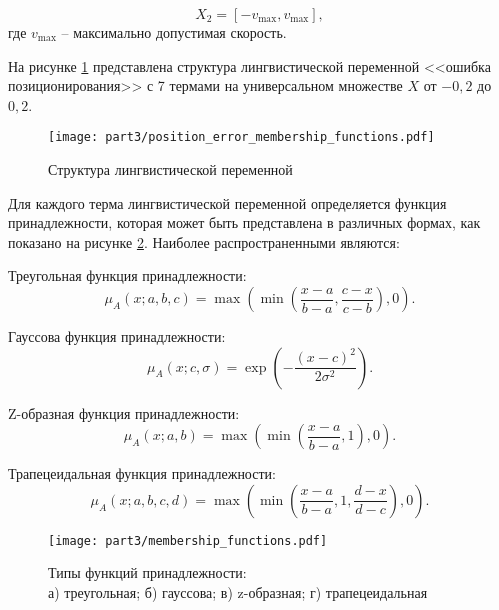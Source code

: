 \begin{equation}
	X_2 = [-v_{\text{max}}, v_{\text{max}}],
\end{equation}
где $v_{\text{max}}$ -- максимально допустимая скорость.

На рисунке \ref{fig:linguistic_variable_structure} представлена структура лингвистической переменной
<<ошибка позиционирования>> с
7 термами на универсальном множестве $X$ от $-0,2$ до $0,2$.

\begin{figure}[ht]
	\centering
	\texttt{[image: part3/position\_error\_membership\_functions.pdf]}
	\caption{Структура лингвистической переменной}
	\label{fig:linguistic_variable_structure}
\end{figure}

Для каждого терма лингвистической переменной определяется функция принадлежности,
которая может быть представлена в различных формах,
как показано на рисунке \ref{fig:membership_functions_types}.
Наиболее распространенными являются:

Треугольная функция принадлежности:
\begin{equation}
	\mu_A(x; a, b, c) = \max\left(\min\left(\frac{x-a}{b-a}, \frac{c-x}{c-b}\right), 0\right).
\end{equation}

Гауссова функция принадлежности:
\begin{equation}\label{eq:gaussian_membership}
	\mu_A(x; c, \sigma) = \exp\left(-\frac{(x-c)^2}{2\sigma^2}\right).
\end{equation}

Z-образная функция принадлежности:
\begin{equation}\label{eq:z_membership}
	\mu_A(x; a, b) = \max\left(\min\left(\frac{x-a}{b-a}, 1\right), 0\right).
\end{equation}

Трапецеидальная функция принадлежности:
\begin{equation}
	\mu_A(x; a, b, c, d) = \max\left(\min\left(\frac{x-a}{b-a}, 1, \frac{d-x}{d-c}\right), 0\right).
\end{equation}

\begin{figure}[ht]
	\centering
	\texttt{[image: part3/membership\_functions.pdf]}
	\caption{Типы функций принадлежности:\\
		а) треугольная; б) гауссова; в) z-образная; г) трапецеидальная}
	\label{fig:membership_functions_types}
\end{figure}

